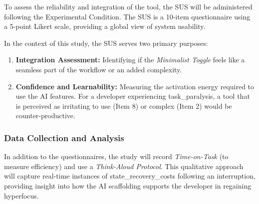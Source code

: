 To assess the reliability and integration of the tool, the \gls{SUS} will be administered following the Experimental Condition. The \gls{SUS} is a 10-item questionnaire using a 5-point Likert scale, providing a global view of system usability. 

In the context of this study, the \gls{SUS} serves two primary purposes:
\begin{enumerate}
    \item \textbf{Integration Assessment:} Identifying if the \textit{Minimalist Toggle} feels like a seamless part of the workflow or an added complexity.
    \item \textbf{Confidence and Learnability:} Measuring the activation energy required to use the \gls{AI} features. For a developer experiencing \gls{task_paralysis}, a tool that is perceived as irritating to use (Item 8) or complex (Item 2) would be counter-productive.
\end{enumerate}

\subsubsection{Data Collection and Analysis}
In addition to the questionnaires, the study will record \textit{Time-on-Task} (to measure efficiency) and use a \textit{Think-Aloud Protocol}. This qualitative approach will capture real-time instances of \glspl{state_recovery_cost} following an interruption, providing insight into how the \gls{AI} \gls{scaffolding} supports the developer in regaining \gls{hyperfocus}.

\newpage